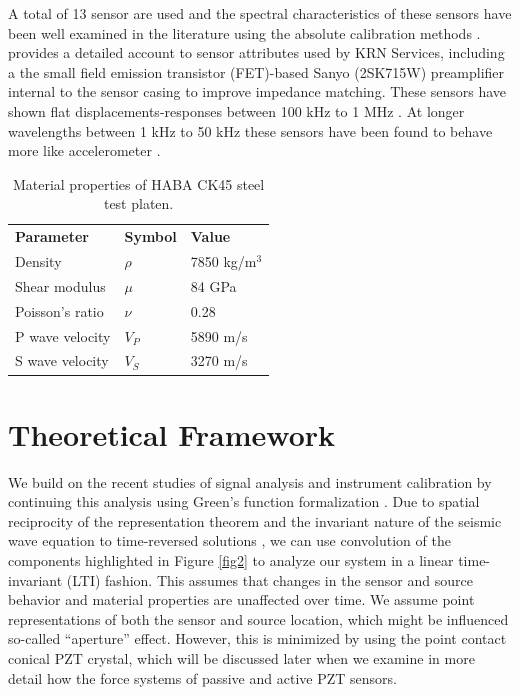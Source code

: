 \documentclass[preprint,3p, 11pt,authoryear]{elsarticle}
\begin{document}
A total of 13 sensor are used and the spectral characteristics of these sensors have been well examined in the literature using the absolute calibration methods \citep{Glaser1998, McLaskey2010, McLaskey2012, Selvadurai2015, Selvadurai2019, Wu}. \citet{Glaser1998} provides a detailed account to sensor attributes used by KRN Services, including a the small field emission transistor (FET)-based Sanyo (2SK715W) preamplifier internal to the sensor casing to improve impedance matching.  These sensors have shown flat displacements-responses between 100 kHz to 1 MHz \citep{McLaskey2012, Selvadurai2019}.  At longer wavelengths between 1 kHz to 50 kHz these sensors have been found to behave more like accelerometer \citep{Wu}.



\begin{table}[ht]
	\centering
	\caption{Material properties of HABA CK45 steel test platen.}
	\begin{tabular}{ m{5cm} m{2cm} m{4cm}} 
		\hline  
		\bf{Parameter} 			& \bf{Symbol} 		& \bf{Value}	\\
	    Density                 	& $\rho$            & 7850 kg/m$^{3}$\\
	    Shear modulus        & $\mu$             & 84 GPa \\
	    Poisson's ratio         & $\nu$             & 0.28\\
	    P wave velocity       & $V_{P}$           & 5890 m/s\\
	    S wave velocity       & $V_{S}$           & 3270 m/s\\	    
		\hline  	
	\end{tabular}
	\label{table1}
\end{table}


\section{Theoretical Framework}
\label{theo}

We build on the recent studies of signal analysis and instrument calibration by \citet{McLaskey2012} continuing this analysis using Green's function formalization \citep{Aki2002, Johnson1974}. Due to spatial reciprocity of the representation theorem \citep{Aki2002} and the invariant nature of the seismic wave equation to time-reversed solutions \citep{Fink1992}, we can use convolution of the components highlighted in Figure \ref{fig2} to analyze our system in a linear time-invariant (LTI) fashion. This assumes that changes in the sensor and source behavior and material properties are unaffected over time.  We assume point representations of both the sensor and source location, which might be influenced so-called ``aperture'' effect. However, this is minimized by using the point contact conical PZT crystal, which will be discussed later when we examine in more detail how the force systems of passive and active PZT sensors.
\end{document}
